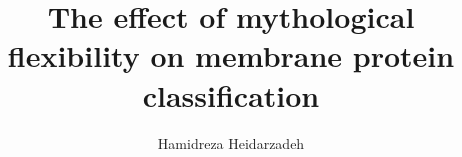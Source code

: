 \author{Hamidreza Heidarzadeh}
\title{The effect of mythological flexibility on membrane protein classification}

